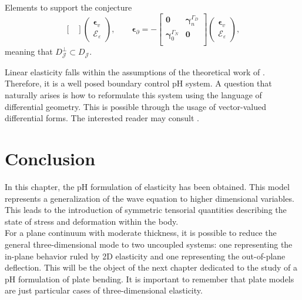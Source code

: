\begin{paragraph}{Elements to support the conjecture}
\begin{equation*}
\begin{bmatrix}
	\end{bmatrix} \begin{pmatrix}
	\bm{\epsilon}_v \\
	\bm{\mathcal{E}}_\varepsilon
	\end{pmatrix}, \qquad 
	\bm{\epsilon}_{\partial} = -
	\begin{bmatrix}
	\bm{0} & \bm\gamma_{n}^{\Gamma_D} \\
	\bm\gamma_0^{\Gamma_N} & \bm{0} \\
	\end{bmatrix}
	\begin{pmatrix}
	\bm{\epsilon}_v \\
	\bm{\mathcal{E}}_\varepsilon
	\end{pmatrix},
	\end{equation*}
	meaning that ${D}_{\mathcal{J}}^\perp \subset {D}_{\mathcal{J}}$. 
\end{paragraph}

Linear elasticity falls within the assumptions of the theoretical work of \cite{skrepek2019wellposedness}. Therefore, it is a well posed boundary control pH system. A question that naturally arises is how to reformulate this system using the language of differential geometry. This is possible through the usage of vector-valued differential forms. The interested reader may consult \cite{brezzi2008mixed}.


\section{Conclusion}
In this chapter, the pH formulation of elasticity has been obtained. This model represents a generalization of the wave equation to higher dimensional variables. This leads to the introduction of symmetric tensorial quantities describing the state of stress and deformation within the body. \\
For a plane continuum with moderate thickness, it is possible to
reduce the general three-dimensional mode to two uncoupled systems: one representing the in-plane behavior ruled by 2D elasticity and one representing the out-of-plane deflection. This will be the object of the next chapter dedicated to the study of a pH formulation of plate bending. It is important to remember that plate models are just particular cases of three-dimensional elasticity.




